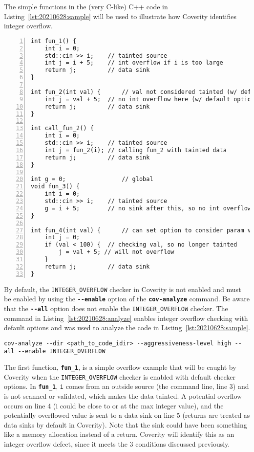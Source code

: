 The simple functions in the (very C-like) C++ code in Listing~\ref{lst:20210628:sample} will be used to illustrate how Coverity identifies integer overflow. 
\begin{lstlisting}[caption={Integer Overflow Examples},captionpos=b,style=CStyle,basicstyle=\small,label={lst:20210628:sample},numbers=left,stepnumber=1]
int fun_1() {
	int i = 0;
	std::cin >> i;    // tainted source
	int j = i + 5;    // int overflow if i is too large
	return j;         // data sink 
}

int fun_2(int val) {      // val not considered tainted (w/ default options)
	int j = val + 5;  // no int overflow here (w/ default options)
	return j;         // data sink 
}

int call_fun_2() {
	int i = 0;
	std::cin >> i;    // tainted source
	int j = fun_2(i); // calling fun_2 with tainted data
	return j;         // data sink 
}

int g = 0;                // global
void fun_3() {
	int i = 0;
	std::cin >> i;    // tainted source
	g = i + 5;        // no sink after this, so no int overflow flagged
}

int fun_4(int val) {      // can set option to consider param val to be tainted
	int j = 0;
	if (val < 100) {  // checking val, so no longer tainted
		j = val + 5; // will not overflow
	}
	return j;         // data sink
}
\end{lstlisting}

By default, the \texttt{INTEGER\_OVERFLOW} checker in Coverity is not enabled and must be enabled by using the \textbf{\texttt{-\phantom{}-enable}} option of the \textbf{\texttt{cov-analyze}} command. Be aware that the \textbf{\texttt{-\phantom{}-all}} option does not enable the \texttt{INTEGER\_OVERFLOW} checker.\autocite{20210628:coverity} The command in Listing~\ref{lst:20210628:analyze} enables integer overflow checking with default options and was used to analyze the code in Listing~\ref{lst:20210628:sample}.
\begin{lstlisting}[caption={Cov-analyze Parameters},captionpos=b,style=BashStyle,basicstyle=\small,label={lst:20210628:analyze},literate=*{-}{-}1,breaklines=true]
cov-analyze --dir <path_to_code_idir> --aggressiveness-level high --all --enable INTEGER_OVERFLOW
\end{lstlisting}

The first function, \textbf{\texttt{fun\_1}}, is a simple overflow example that will be caught by Coverity when the \texttt{INTEGER\_OVERFLOW} checker is enabled with default checker options. In \textbf{\texttt{fun\_1}}, \texttt{i} comes from an outside source (the command line, line 3) and is not scanned or validated, which makes the data tainted. A potential overflow occurs on line 4 (i could be close to or at the max integer value), and the potentially overflowed value is sent to a data sink on line 5 (returns are treated as data sinks by default in Coverity). Note that the sink could have been something like a memory allocation instead of a return. Coverity will identify this as an integer overflow defect, since it meets the 3 conditions discussed previously.

